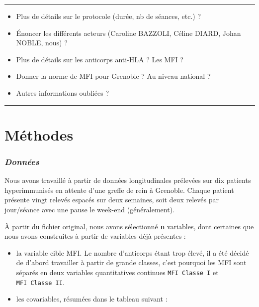 \documentclass[
]{article}
\providecommand{\tightlist}{%
  \setlength{\itemsep}{0pt}\setlength{\parskip}{0pt}}
\begin{document}
\begin{center}\rule{0.5\linewidth}{0.5pt}\end{center}

\begin{itemize}
\tightlist
\item
  Plus de détails sur le protocole (durée, nb de séances, etc.) ?
\item
  Énoncer les différents acteurs (Caroline BAZZOLI, Céline DIARD, Johan
  NOBLE, nous) ?
\item
  Plus de détails sur les anticorps anti-HLA ? Les MFI ?
\item
  Donner la norme de MFI pour Grenoble ? Au niveau national ?
\item
  Autres informations oubliées ?
\end{itemize}

\begin{center}\rule{0.5\linewidth}{0.5pt}\end{center}

\section{\texorpdfstring{\textbf{Méthodes}}{Méthodes}}\label{muxe9thodes}

\subsubsection{\texorpdfstring{\emph{Données}}{Données}}\label{donnuxe9es}

Nous avons travaillé à partir de données longitudinales prélevées sur
dix patients hyperimmunisés en attente d'une greffe de rein à Grenoble.
Chaque patient présente vingt relevés espacés sur deux semaines, soit
deux relevés par jour/séance avec une pause le week-end (généralement).

À partir du fichier original, nous avons sélectionné \textbf{n}
variables, dont certaines que nous avons construites à partir de
variables déjà présentes :

\begin{itemize}
\tightlist
\item
  la variable cible MFI. Le nombre d'anticorps étant trop élevé, il a
  été décidé de d'abord travailler à partir de grande classes, c'est
  pourquoi les MFI sont séparés en deux variables quantitatives
  continues \texttt{MFI\ Classe\ I} et \texttt{MFI\ Classe\ II}.
\item
  les covariables, résumées dans le tableau suivant :
\end{itemize}
\end{document}
